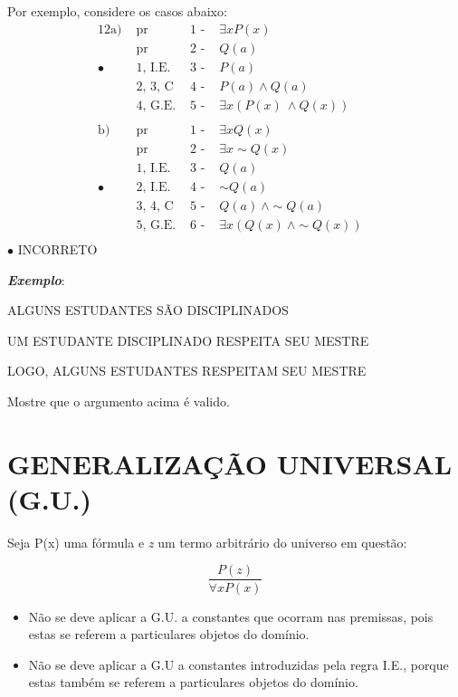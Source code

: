 Por exemplo, considere os casos abaixo:
\begin{alignat*}{12}
    \text{a) } & \text{pr}       & \text{1 - } & \exists x P(x) &\\
               & \text{pr}       & \text{2 - } & Q(a) &\\
    \bullet\;  & \text{1, I.E. } & \text{3 - } & P(a) &\\
               & \text{2, 3, C } & \text{4 - } & P(a) \land Q(a) &\\
               & \text{4, G.E. } & \text{5 - } & \exists x (P(x)\ \land Q(x)) &\\
               & & & &\\ %
    \text{b) } & \text{pr}       & \text{1 - } & \exists x Q(x) &\\
               & \text{pr}       & \text{2 - } & \exists x \sim Q(x) &\\
               & \text{1, I.E. } & \text{3 - } & Q(a) &\\
    \bullet\;  & \text{2, I.E. } & \text{4 - } & \sim Q(a) &\\
               & \text{3, 4, C } & \text{5 - } & Q(a)\ \land \sim Q(a) &\\
               & \text{5, G.E. } & \text{6 - } & \exists x (Q(x)\ \land \sim Q(x)) &\\
\end{alignat*}
$\bullet$ INCORRETO
\pagebreak

\noindent \textit{\textbf{Exemplo}}:

ALGUNS ESTUDANTES SÃO DISCIPLINADOS

UM ESTUDANTE DISCIPLINADO RESPEITA SEU MESTRE

LOGO, ALGUNS ESTUDANTES RESPEITAM SEU MESTRE

\noindent Mostre que o argumento acima é valido.

\section{GENERALIZAÇÃO UNIVERSAL (G.U.)}
Seja P(x) uma fórmula e \textit{z} um termo arbitrário do universo em questão:

\[
\boxed{\frac{P(z)}{\forall x P(x)}}
\]

\begin{itemize}
    \item Não se deve aplicar a G.U. a constantes que ocorram nas premissas, pois estas se referem a particulares objetos do domínio.

    \item Não se deve aplicar a G.U a constantes introduzidas pela regra I.E., porque estas também se referem a particulares objetos do domínio.
\end{itemize}

